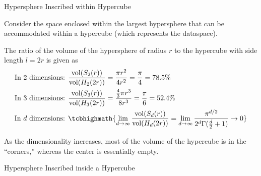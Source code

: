 \begin{frame}{Hypersphere Inscribed within Hypercube}

Consider the space
enclosed within the largest hypersphere that can be accommodated within
a hypercube (which represents the dataspace).  

\medskip
The ratio of the volume of the hypersphere of radius $r$ to the
hypercube with side length $l=2r$ is given as
\begin{align*}
  \text{In 2 dimensions: } &
  \frac{\vol(S_2(r))}{\vol(H_2(2r))} = \frac{\pi r^2}{4 r^2} = \frac{\pi}{4} = 78.5\%\\
  \text{In 3 dimensions: } &
\frac{\vol(S_3(r))}{\vol(H_3(2r))} = 
\frac{\frac{4}{3} \pi r^3}{8 r^3} = \frac{\pi}{6} = 52.4\%\\
\text{In $d$ dimensions: } &
\tcbhighmath{
\lim_{d \to \infty} \frac{\vol(S_d(r))}{\vol(H_d(2r))} = \lim_{d \to \infty}
\frac{\pi^{d/2}}{2^d \Gamma(\frac{d}{2}+1)} \to 0
}
\end{align*}

As the dimensionality increases, most of the volume of
the hypercube is in the ``corners,'' whereas the center is essentially
empty. 
\end{frame}


\begin{frame}{Hypersphere Inscribed inside a Hypercube}
\centerline{
\hspace{0.25in}
}
\end{frame}



